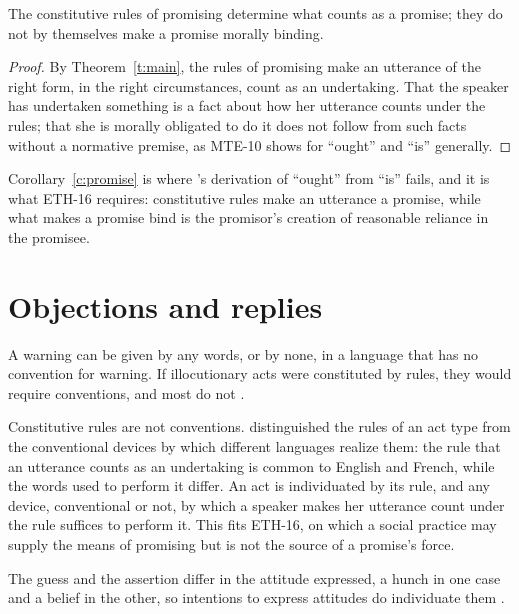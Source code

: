 \documentclass{situationist-preprint}
\begin{document}
\begin{corollary}\label{c:promise}
The constitutive rules of promising determine what counts as a promise; they do not by themselves make a promise morally binding.
\end{corollary}

\begin{proof}
By Theorem~\ref{t:main}, the rules of promising make an utterance of the right form, in the right circumstances, count as an undertaking. That the speaker has undertaken something is a fact about how her utterance counts under the rules; that she is morally obligated to do it does not follow from such facts without a normative premise, as MTE-10 shows for \enquote{ought} and \enquote{is} generally.
\end{proof}

Corollary~\ref{c:promise} is where \citet{Searle1964}'s derivation of \enquote{ought} from \enquote{is} fails, and it is what ETH-16 requires: constitutive rules make an utterance a promise, while what makes a promise bind is the promisor's creation of reasonable reliance in the promisee.

\section{Objections and replies}

\begin{objection}\label{o:strawson}
A warning can be given by any words, or by none, in a language that has no convention for warning. If illocutionary acts were constituted by rules, they would require conventions, and most do not \citep{Strawson1964}.
\end{objection}

\begin{reply}
Constitutive rules are not conventions. \citet{Searle1969} distinguished the rules of an act type from the conventional devices by which different languages realize them: the rule that an utterance counts as an undertaking is common to English and French, while the words used to perform it differ. An act is individuated by its rule, and any device, conventional or not, by which a speaker makes her utterance count under the rule suffices to perform it. This fits ETH-16, on which a social practice may supply the means of promising but is not the source of a promise's force.
\end{reply}

\begin{objection}\label{o:bh}
The guess and the assertion differ in the attitude expressed, a hunch in one case and a belief in the other, so intentions to express attitudes do individuate them \citep{BachHarnish1979}.
\end{objection}
\end{document}
